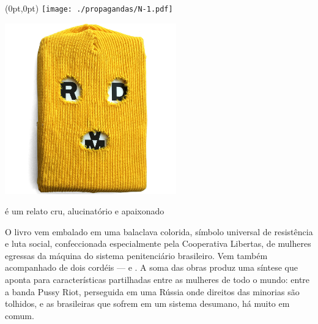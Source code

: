 \pagestyle{n-1}
\label{n-1}

\begin{textblock*}{5.625in}(0pt,0pt)%
\vspace*{-3.5cm}
\hspace*{-2.77cm}\texttt{[image: ./propagandas/N-1.pdf]}
\end{textblock*}

\pagebreak %

\begin{center}

\hspace*{.5cm}\includegraphics[width=74mm]{./grid/riot.jpg}
\end{center}

\hspace*{-7cm}\hrulefill\hspace*{-7cm}

\medskip

 é um relato cru, alucinatório e apaixonado 

O livro vem embalado em uma balaclava colorida, símbolo universal de resistência e luta social, confeccionada especialmente pela Cooperativa Libertas, de mulheres egressas da máquina do sistema penitenciário brasileiro. Vem também acompanhado de dois cordéis --- {} e {}. A soma das obras produz uma síntese que aponta para características partilhadas entre as mulheres de todo o mundo: entre a banda Pussy Riot, perseguida em uma Rússia onde direitos das minorias são tolhidos, e as brasileiras que sofrem em um sistema desumano, há muito em comum. 

